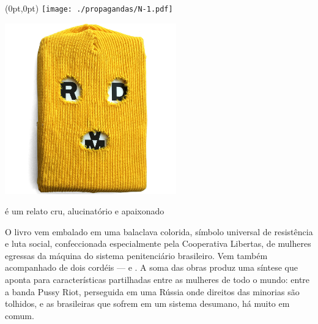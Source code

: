 \pagestyle{n-1}
\label{n-1}

\begin{textblock*}{5.625in}(0pt,0pt)%
\vspace*{-3.5cm}
\hspace*{-2.77cm}\texttt{[image: ./propagandas/N-1.pdf]}
\end{textblock*}

\pagebreak %

\begin{center}

\hspace*{.5cm}\includegraphics[width=74mm]{./grid/riot.jpg}
\end{center}

\hspace*{-7cm}\hrulefill\hspace*{-7cm}

\medskip

 é um relato cru, alucinatório e apaixonado 

O livro vem embalado em uma balaclava colorida, símbolo universal de resistência e luta social, confeccionada especialmente pela Cooperativa Libertas, de mulheres egressas da máquina do sistema penitenciário brasileiro. Vem também acompanhado de dois cordéis --- {} e {}. A soma das obras produz uma síntese que aponta para características partilhadas entre as mulheres de todo o mundo: entre a banda Pussy Riot, perseguida em uma Rússia onde direitos das minorias são tolhidos, e as brasileiras que sofrem em um sistema desumano, há muito em comum. 

